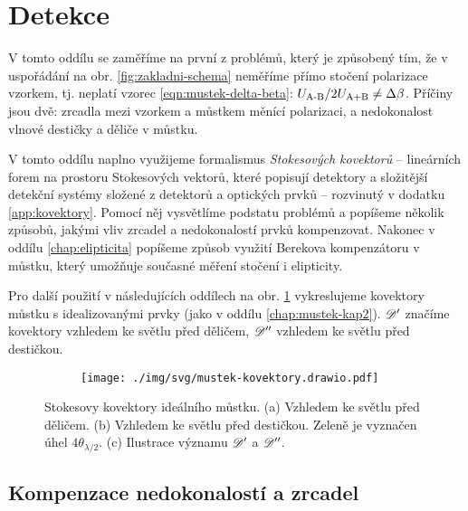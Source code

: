 \section{Detekce}
\label{chap:detekce}

V tomto oddílu se zaměříme na první z problémů, který je způsobený tím, že v uspořádání na obr. \ref{fig:zakladni-schema} neměříme přímo stočení polarizace vzorkem, tj. neplatí vzorec \eqref{eqn:mustek-delta-beta}: $U_\textrm{A-B}/2U_\textrm{A+B}\neq\Delta\beta$.
Příčiny jsou dvě: zrcadla mezi vzorkem a můstkem měnící polarizaci, a nedokonalost vlnové destičky a děliče v můstku.

V tomto oddílu naplno využijeme formalismus \emph{Stokesových kovektorů} -- lineárních forem na prostoru Stokesových vektorů, které popisují detektory a složitější detekční systémy složené z detektorů a optických prvků -- rozvinutý v dodatku \ref{app:kovektory}.
Pomocí něj vysvětlíme podstatu problémů a popíšeme několik způsobů, jakými vliv zrcadel a nedokonalostí prvků kompenzovat.
Nakonec v oddílu \ref{chap:elipticita} popíšeme způsob využití Berekova kompenzátoru v můstku, který umožňuje současné měření stočení i elipticity.

Pro další použití v následujících oddílech na obr. \ref{fig:kovektor-ideal-mustek} vykreslujeme kovektory můstku s idealizovanými prvky (jako v oddílu \ref{chap:mustek-kap2}).
$\mathscr{D}'$ značíme kovektory vzhledem ke světlu před děličem, $\mathscr{D}''$ vzhledem ke světlu před destičkou.

\begin{figure}[htbp]
    \centering
    \begin{subfigure}{.35\textwidth}
        \centering
        
    \end{subfigure}
    \begin{subfigure}{.34\textwidth}
        \centering
        
    \end{subfigure}
    \begin{subfigure}{.3\textwidth}
        \centering
        \texttt{[image: ./img/svg/mustek-kovektory.drawio.pdf]}
    \end{subfigure}
    \caption{Stokesovy kovektory ideálního můstku. (a) Vzhledem ke světlu před děličem. (b) Vzhledem ke světlu před destičkou. Zeleně je vyznačen úhel $4\theta_{\lambda/2}$. (c) Ilustrace významu $\mathscr{D}'$ a $\mathscr{D}''$.}
    \label{fig:kovektor-ideal-mustek}
\end{figure}

\subsection{Kompenzace nedokonalostí a zrcadel}
\label{chap:kompenzace}

